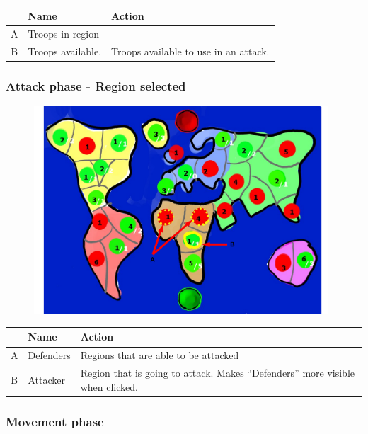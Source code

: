 \documentclass[12pt,a4paper]{article}
\begin{document}
\begin{table}[H]
\small
\centering
\begin{tabular}{c|p{5cm}|p{7cm}}
& Name & Action \\ \hline\hline
A
&Troops in region
\\B
&Troops available.
&Troops available to use in an attack.
\end{tabular}
\end{table}


\subsubsection{Attack phase - Region selected}\label{mock:754}

\begin{figure}[H]
  \centering
  \includegraphics[width=11cm]{pic/mocks/5-4.pdf}
\end{figure}

\begin{table}[H]
\small
\centering
\begin{tabular}{c|p{5cm}|p{7cm}}
& Name & Action \\ \hline\hline
A
&Defenders
&Regions that are able to be attacked
\\B
&Attacker
&Region that is going to attack. Makes “Defenders” more visible when clicked.
\end{tabular}
\end{table}


\subsubsection{Movement phase}\label{mock:755}
\end{document}
